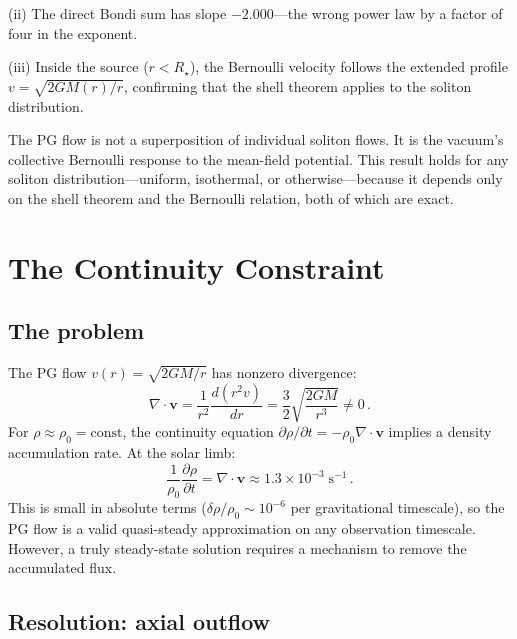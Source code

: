 \documentclass[12pt, a4paper]{article}
\begin{document}
(ii) The direct Bondi sum has slope $-2.000$---the
wrong power law by a factor of four in the exponent.

(iii) Inside the source ($r < R_\star$), the
Bernoulli velocity follows the extended profile
$v = \sqrt{2GM(r)/r}$, confirming that the shell
theorem applies to the soliton distribution.

The PG flow is not a superposition of individual
soliton flows. It is the vacuum's collective Bernoulli
response to the mean-field potential. This result holds
for any soliton distribution---uniform, isothermal, or
otherwise---because it depends only on the shell
theorem and the Bernoulli relation, both of which are
exact.


\section{The Continuity Constraint}
\label{sec:continuity}

\subsection{The problem}

The PG flow $v(r) = \sqrt{2GM/r}$ has nonzero
divergence:
\begin{equation}
    \nabla\cdot\mathbf{v}
    = \frac{1}{r^2}\frac{d(r^2 v)}{dr}
    = \frac{3}{2}\sqrt{\frac{2GM}{r^3}} \neq 0\,.
\label{eq:divergence}
\end{equation}
For $\rho \approx \rho_0 = \text{const}$, the
continuity equation
$\partial\rho/\partial t = -\rho_0\nabla\cdot
\mathbf{v}$ implies a density accumulation rate.
At the solar limb:
\begin{equation}
    \frac{1}{\rho_0}\frac{\partial\rho}{\partial t}
    = \nabla\cdot\mathbf{v}
    \approx 1.3 \times 10^{-3}\;\text{s}^{-1}\,.
\end{equation}
This is small in absolute terms ($\delta\rho/\rho_0
\sim 10^{-6}$ per gravitational timescale), so the PG
flow is a valid quasi-steady approximation on any
observation timescale. However, a truly steady-state
solution requires a mechanism to remove the
accumulated flux.

\subsection{Resolution: axial outflow}
\end{document}
